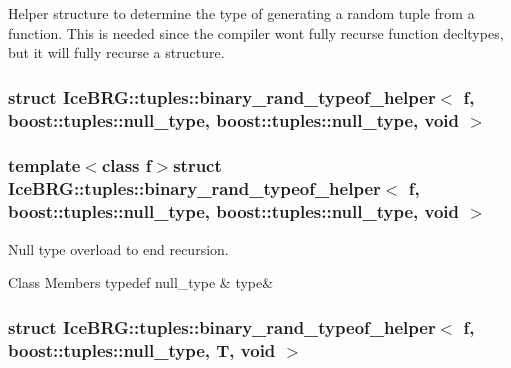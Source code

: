 Helper structure to determine the type of generating a random tuple from a function. This is needed since the compiler won\textquotesingle{}t fully recurse function decltypes, but it will fully recurse a structure. \label{structIceBRG_1_1tuples_1_1binary__rand__typeof__helper_3_01f_00_01boost_1_1tuples_1_1null__type_5c02c427c306686c3b1206a9b133bf57}
\hypertarget{namespaceIceBRG_1_1tuples_structIceBRG_1_1tuples_1_1binary__rand__typeof__helper_3_01f_00_01boost_1_1tuples_1_1null__type_5c02c427c306686c3b1206a9b133bf57}{}
\subsubsection{struct Ice\+B\+R\+G\+:\+:tuples\+:\+:binary\+\_\+rand\+\_\+typeof\+\_\+helper$<$ f, boost\+:\+:tuples\+:\+:null\+\_\+type, boost\+:\+:tuples\+:\+:null\+\_\+type, void $>$}
\subsubsection*{template$<$class f$>$struct Ice\+B\+R\+G\+::tuples\+::binary\+\_\+rand\+\_\+typeof\+\_\+helper$<$ f, boost\+::tuples\+::null\+\_\+type, boost\+::tuples\+::null\+\_\+type, void $>$}

Null type overload to end recursion. \begin{DoxyFields}{Class Members}
\hypertarget{namespaceIceBRG_1_1tuples_a0236af1786620d7501c4b5dea46375f3}{}typedef null\+\_\+type\label{namespaceIceBRG_1_1tuples_a0236af1786620d7501c4b5dea46375f3}
&
type&
\\
\hline

\end{DoxyFields}
\label{structIceBRG_1_1tuples_1_1binary__rand__typeof__helper_3_01f_00_01boost_1_1tuples_1_1null__type_00_01T_00_01void_01_4}
\hypertarget{namespaceIceBRG_1_1tuples_structIceBRG_1_1tuples_1_1binary__rand__typeof__helper_3_01f_00_01boost_1_1tuples_1_1null__type_00_01T_00_01void_01_4}{}
\subsubsection{struct Ice\+B\+R\+G\+:\+:tuples\+:\+:binary\+\_\+rand\+\_\+typeof\+\_\+helper$<$ f, boost\+:\+:tuples\+:\+:null\+\_\+type, T, void $>$}
